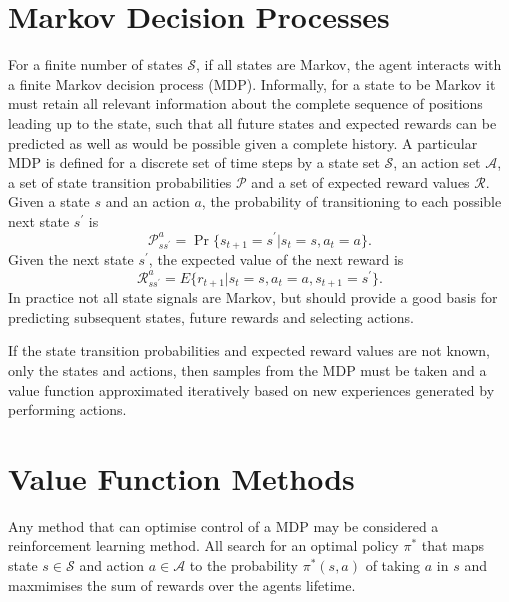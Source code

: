 \section{Markov Decision Processes}
For a finite number of states $\mathscr{S}$, if all states are Markov, the
agent interacts with a finite Markov decision process (MDP).  Informally,
for a state to be Markov it must retain all relevant information about the
complete sequence of positions leading up to the state, such that all future
states and expected rewards can be predicted as well as would be possible given
a complete history.  A particular MDP is defined for a discrete set of time
steps by a state set $\mathscr{S}$, an action set $\mathscr{A}$, a set of state
transition probabilities $\mathscr{P}$ and a set of expected reward values
$\mathscr{R}$.  Given a state $s$ and an action $a$, the probability of
transitioning to each possible next state $s^\prime$ is
\begin{equation}
\mathscr{P}^a_{ss^\prime} = \Pr \bigl\lbrace s_{t+1} = s^\prime \vert s_t=s,
a_t=a \bigr\rbrace .
\end{equation}
Given the next state $s^\prime$, the expected value of the next reward is
\begin{equation}
\mathscr{R}^a_{ss^\prime} = E \bigl\lbrace r_{t+1} \vert s_t=s, a_t=a,
s_{t+1}=s^\prime \bigr\rbrace .
\end{equation}
In practice not all state signals are Markov, but should provide a good basis
for predicting subsequent states, future rewards and selecting actions.

If the state transition probabilities and expected reward values are not known,
only the states and actions, then samples from the MDP must be taken and a value
function approximated iteratively based on new experiences generated by
performing actions.

\section{Value Function Methods}
\label{sec:valuebased}
Any method that can optimise control of a MDP may be considered a reinforcement
learning method.  All search for an optimal policy $\pi^*$ that maps state
$s \in \mathscr{S}$ and action $a \in \mathscr{A}$ to the probability
$\pi^*(s,a)$ of taking $a$ in $s$ and maxmimises the sum of rewards over the
agents lifetime.

